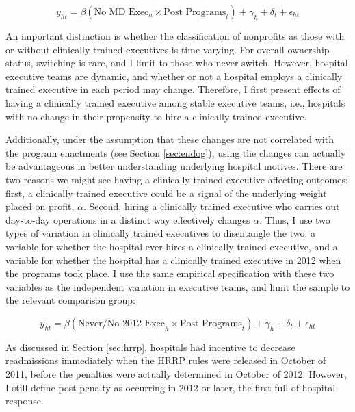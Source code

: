 \documentclass[12pt]{article}
\begin{document}
    \begin{equation}
    \label{eq:clinical}
    y_{ht} = \beta (\text{No MD Exec}_h \times \text{Post Programs}_t) + \gamma_{h} + \delta_t + \epsilon_{ht}
    \end{equation}

    An important distinction is whether the classification of nonprofits as those with or without clinically trained executives is time-varying. For overall ownership status, switching is rare, and I limit to those who never switch. However, hospital executive teams are dynamic, and whether or not a hospital employs a clinically trained executive in each period may change. Therefore, I first present effects of having a clinically trained executive among stable executive teams, i.e., hospitals with no change in their propensity to hire a clinically trained executive. 
    
    Additionally, under the assumption that these changes are not correlated with the program enactments (see Section \ref{sec:endog}), using the changes can actually be advantageous in better understanding underlying hospital motives. There are two reasons we might see having a clinically trained executive affecting outcomes: first, a clinically trained executive could be a signal of the underlying weight placed on profit, $\alpha$. Second, hiring a clinically trained executive who carries out day-to-day operations in a distinct way effectively changes $\alpha$. Thus, I use two types of variation in clinically trained executives to disentangle the two: a variable for whether the hospital ever hires a clinically trained executive, and a variable for whether the hospital has a clinically trained executive in 2012 when the programs took place. I use the same empirical specification with these two variables as the independent variation in executive teams, and limit the sample to the relevant comparison group: 

    \begin{equation}
    \label{eq:decomp}
    y_{ht} = \beta (\text{Never/No 2012 Exec}_h \times \text{Post Programs}_t) + \gamma_{h} + \delta_t + \epsilon_{ht}
    \end{equation}
    
    As discussed in Section \ref{sec:hrrp}, hospitals had incentive to decrease readmissions immediately when the HRRP rules were released in October of 2011, before the penalties were actually determined in October of 2012. However, I still define post penalty as occurring in 2012 or later, the first full of hospital response.
\end{document}
